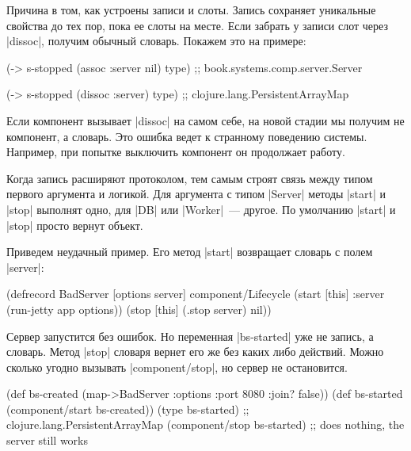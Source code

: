 Причина в том, как устроены записи и слоты. Запись сохраняет уникальные свойства
до тех пор, пока ее слоты на месте. Если забрать у записи слот через
\spverb|dissoc|, получим обычный словарь. Покажем это на примере:

\begin{english}
  \begin{clojure}
(-> s-stopped (assoc :server nil) type)
;; book.systems.comp.server.Server

(-> s-stopped (dissoc :server) type)
;; clojure.lang.PersistentArrayMap
  \end{clojure}
\end{english}

Если компонент вызывает \spverb|dissoc| на самом себе, на новой стадии мы
получим не компонент, а словарь. Это ошибка ведет к странному поведению
системы. Например, при попытке выключить компонент он продолжает работу.

Когда запись расширяют протоколом, тем самым строят связь между типом первого
аргумента и логикой. Для аргумента с типом \spverb|Server| методы \spverb|start|
и \spverb|stop| выполнят одно, для \spverb|DB| или \spverb|Worker|~---
другое. По умолчанию \spverb|start| и \spverb|stop| просто вернут объект.

Приведем неудачный пример. Его метод \spverb|start| возвращает словарь с полем
\spverb|server|:

\begin{english}
  \begin{clojure}
(defrecord BadServer [options server]
  component/Lifecycle
  (start [this]
    {:server (run-jetty app options)})
  (stop [this]
    (.stop server)
    nil))
  \end{clojure}
\end{english}


Сервер запустится без ошибок. Но переменная \spverb|bs-started| уже не запись, а
словарь. Метод \spverb|stop| словаря вернет его же без каких либо
действий. Можно сколько угодно вызывать \spverb|component/stop|, но сервер не
остановится.

\begin{english}
  \begin{clojure}
(def bs-created (map->BadServer {:options {:port 8080 :join? false}}))
(def bs-started (component/start bs-created))
(type bs-started)
;; clojure.lang.PersistentArrayMap
(component/stop bs-started)
;; does nothing, the server still works
  \end{clojure}
\end{english}

